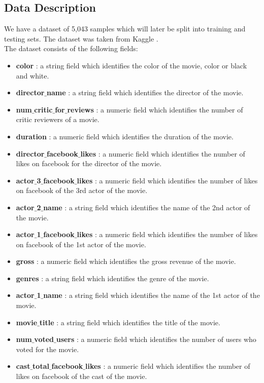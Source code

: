 \documentclass[conference]{IEEEtran}
\begin{document}
\subsection{Data Description}
We have a dataset of 5,043 samples which will later be split into training and testing sets. The dataset was taken from Kaggle \cite{data}.\\
The dataset consists of the following fields:
\begin{itemize}
    \item \textbf{color} : a string field which identifies the color of the movie, color or black and white.
    \item \textbf{director$\_$name} : a string field which identifies the director of the movie.
    \item \textbf{num$\_$critic$\_$for$\_$reviews} : a numeric field which identifies the number of critic reviewers of a movie.
    \item \textbf{duration} : a numeric field which identifies the duration of the movie.
    \item \textbf{director$\_$facebook$\_$likes} : a numeric field which identifies the number of likes on facebook for the director of the movie.
    \item \textbf{actor$\_$3$\_$facebook$\_$likes} : a numeric field which identifies the number of likes on facebook of the 3rd actor of the movie.
    \item \textbf{actor$\_$2$\_$name} : a string field which identifies the name of the 2nd actor of the movie.
    \item \textbf{actor$\_$1$\_$facebook$\_$likes} : a numeric field which identifies the number of likes on facebook of the 1st actor of the movie.
    \item \textbf{gross} : a numeric field which identifies the gross revenue of the movie. 
    \item \textbf{genres}  : a string field which identifies the genre of the movie. 
    \item \textbf{actor$\_$1$\_$name} : a string field which identifies the name of the 1st actor of the movie.
    \item \textbf{movie$\_$title} : a string field which identifies the title of the movie.
    \item \textbf{num$\_$voted$\_$users} : a numeric field which identifies the number of users who voted for the movie. 
    \item \textbf{cast$\_$total$\_$facebook$\_$likes} : a numeric field which identifies the number of likes on facebook of the cast of the movie.

\end{itemize}
\end{document}
